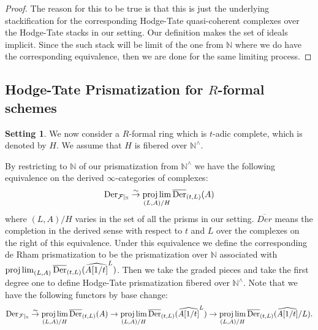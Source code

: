 \documentclass[12pt]{article}
\theoremstyle{definition}
\newtheorem{setting}{Setting}
\begin{document}
\begin{proof}
The reason for this to be true is that this is just the underlying stackification for the corresponding Hodge-Tate quasi-coherent complexes over the Hodge-Tate stacks in our setting. Our definition makes the set of ideals implicit. Since the such stack will be limit of the one from $\mathbb{N}$ where we do have the corresponding equivalence, then we are done for the same limiting process.
\end{proof}










\subsection{Hodge-Tate Prismatization for $R$-formal schemes}

\begin{setting}
We now consider a $R$-formal ring which is $t$-adic complete, which is denoted by $H$. We assume that $H$ is fibered over $\mathbb{N}^\wedge$.
\end{setting}


By restricting to $\mathbb{N}$ of our prismatization from $\mathbb{N}^\wedge$ we have the following equivalence on the derived $\infty$-categories of complexes:
\begin{align}
\mathrm{Der}_{\mathcal{F}|_{\mathbb{N}}}\overset{\sim}{\rightarrow} \projlim_{(L,A)/H}\overline{\mathrm{Der}}_{(t,L)}(A)
\end{align}
where $(L,A)/H$ varies in the set of all the prisms in our setting. $\overline{Der}$ means the completion in the derived sense with respect to $t$ and $L$ over the complexes on the right of this equivalence. Under this equivalence we define the corresponding de Rham prismatization to be the prismatization over $\mathbb{N}$ associated with $\projlim_{(L,A)}\overline{\mathrm{Der}}_{(t,L)}(\widehat{A[1/t]}^{L})$. Then we take the graded pieces and take the first degree one to define Hodge-Tate prismatization fibered over $\mathbb{N}^\wedge$. Note that we have the following functors by base change:
\begin{align}
\mathrm{Der}_{\mathcal{F}|_{\mathbb{N}}}\overset{\sim}{\rightarrow} \projlim_{(L,A)/H}\overline{\mathrm{Der}}_{(t,L)}(A) \overset{}{\rightarrow} \projlim_{(L,A)/H}\overline{\mathrm{Der}}_{(t,L)}(\widehat{A[1/t]}^L) \overset{}{\rightarrow} \projlim_{(L,A)/H}\overline{\mathrm{Der}}_{(t,L)}(\widehat{A[1/t]}/L).
\end{align}
\end{document}
